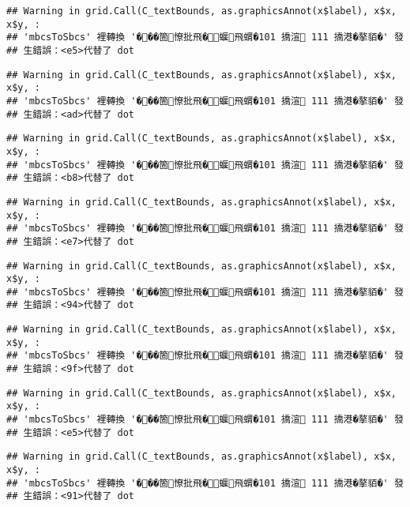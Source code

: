 \documentclass[
]{article}
\begin{document}
\begin{verbatim}
## Warning in grid.Call(C_textBounds, as.graphicsAnnot(x$label), x$x, x$y, :
## 'mbcsToSbcs' 裡轉換 '���箇憭批飛�蝘飛蝟�101 撟渲 111 撟港�摮貊�' 發
## 生錯誤：<e5>代替了 dot
\end{verbatim}

\begin{verbatim}
## Warning in grid.Call(C_textBounds, as.graphicsAnnot(x$label), x$x, x$y, :
## 'mbcsToSbcs' 裡轉換 '���箇憭批飛�蝘飛蝟�101 撟渲 111 撟港�摮貊�' 發
## 生錯誤：<ad>代替了 dot
\end{verbatim}

\begin{verbatim}
## Warning in grid.Call(C_textBounds, as.graphicsAnnot(x$label), x$x, x$y, :
## 'mbcsToSbcs' 裡轉換 '���箇憭批飛�蝘飛蝟�101 撟渲 111 撟港�摮貊�' 發
## 生錯誤：<b8>代替了 dot
\end{verbatim}

\begin{verbatim}
## Warning in grid.Call(C_textBounds, as.graphicsAnnot(x$label), x$x, x$y, :
## 'mbcsToSbcs' 裡轉換 '���箇憭批飛�蝘飛蝟�101 撟渲 111 撟港�摮貊�' 發
## 生錯誤：<e7>代替了 dot
\end{verbatim}

\begin{verbatim}
## Warning in grid.Call(C_textBounds, as.graphicsAnnot(x$label), x$x, x$y, :
## 'mbcsToSbcs' 裡轉換 '���箇憭批飛�蝘飛蝟�101 撟渲 111 撟港�摮貊�' 發
## 生錯誤：<94>代替了 dot
\end{verbatim}

\begin{verbatim}
## Warning in grid.Call(C_textBounds, as.graphicsAnnot(x$label), x$x, x$y, :
## 'mbcsToSbcs' 裡轉換 '���箇憭批飛�蝘飛蝟�101 撟渲 111 撟港�摮貊�' 發
## 生錯誤：<9f>代替了 dot
\end{verbatim}

\begin{verbatim}
## Warning in grid.Call(C_textBounds, as.graphicsAnnot(x$label), x$x, x$y, :
## 'mbcsToSbcs' 裡轉換 '���箇憭批飛�蝘飛蝟�101 撟渲 111 撟港�摮貊�' 發
## 生錯誤：<e5>代替了 dot
\end{verbatim}

\begin{verbatim}
## Warning in grid.Call(C_textBounds, as.graphicsAnnot(x$label), x$x, x$y, :
## 'mbcsToSbcs' 裡轉換 '���箇憭批飛�蝘飛蝟�101 撟渲 111 撟港�摮貊�' 發
## 生錯誤：<91>代替了 dot
\end{verbatim}
\end{document}
